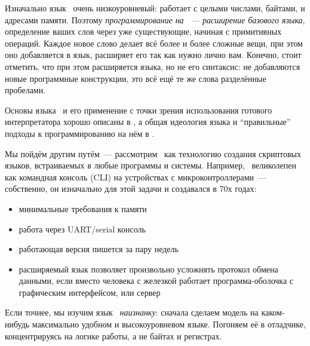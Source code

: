 \noindent
Изначально язык \F\ очень низкоуровневый: работает с целыми числами, байтами, и
адресами памяти. Поэтому \emph{программирование на \F\ --- расширение базового
языка}, определение ваших слов через уже существующие, начиная с примитивных
операций. Каждое новое слово делает всё более и более сложные вещи, при этом оно
добавляется в язык, расширяет его так как нужно лично вам. Конечно, стоит
отметить, что при этом расширяется  языка, но не его синтаксис: не
добавляются новые программные конструкции, это всё ещё те же слова разделённые
пробелами.

Основы языка \F\ и его применение с точки зрения использования готового
интерпретатора хорошо описаны в \cite{starting,brodie}, а общая идеология языка
и ``правильные'' подходы к программированию на нём в \cite{thinking,thinkingru}.

Мы пойдём другим путём\ --- рассмотрим \F\ как технологию создания скриптовых
языков, встраиваемых в любые программы и системы. Например, \F\ великолепен как командная консоль
(CLI) на устройствах с микроконтроллерами\ --- собственно, он изначально для
этой задачи и создавался в 70х годах:
\begin{itemize}[nosep]
    \item минимальные требования к памяти
    \item работа через UART/serial консоль
    \item работающая версия пишется за пару недель
    \item расширяемый язык позволяет произвольно усложнять протокол обмена
    данными, если вместо человека с железкой работает программа-оболочка с
    графическим интерфейсом, или сервер
\end{itemize}

\clearpage
Если точнее, мы изучим язык \F\ \textit{наизнанку}: сначала сделаем модель
 на каком-нибудь максимально удобном и
высокоуровневом языке. Погоняем её в отладчике, концентрируясь на логике работы,
а не байтах и регистрах.
